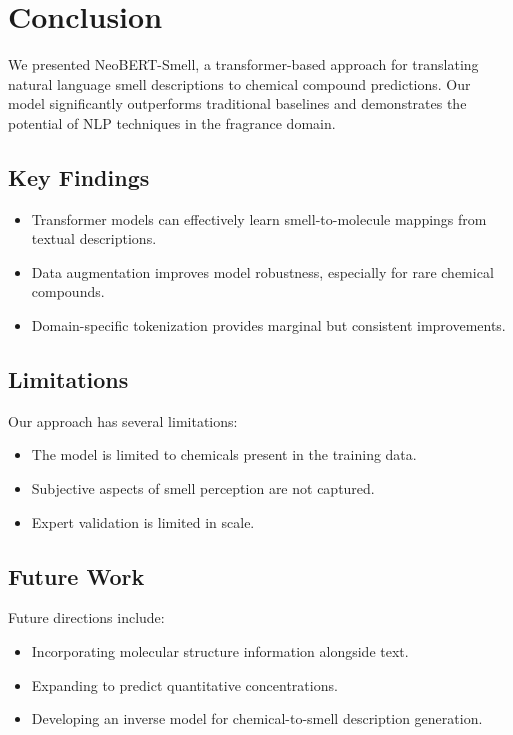 \section{Conclusion}

We presented NeoBERT-Smell, a transformer-based approach for translating natural language smell descriptions to chemical compound predictions. Our model significantly outperforms traditional baselines and demonstrates the potential of NLP techniques in the fragrance domain.

\subsection{Key Findings}

\begin{itemize}
    \item Transformer models can effectively learn smell-to-molecule mappings from textual descriptions.
    \item Data augmentation improves model robustness, especially for rare chemical compounds.
    \item Domain-specific tokenization provides marginal but consistent improvements.
\end{itemize}

\subsection{Limitations}

Our approach has several limitations:
\begin{itemize}
    \item The model is limited to chemicals present in the training data.
    \item Subjective aspects of smell perception are not captured.
    \item Expert validation is limited in scale.
\end{itemize}

\subsection{Future Work}

Future directions include:
\begin{itemize}
    \item Incorporating molecular structure information alongside text.
    \item Expanding to predict quantitative concentrations.
    \item Developing an inverse model for chemical-to-smell description generation.
\end{itemize}
